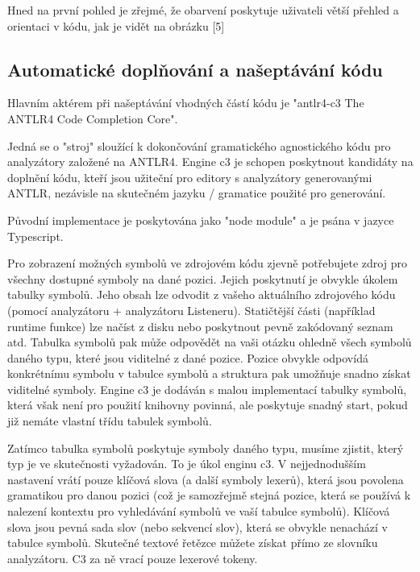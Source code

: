 \documentclass[czech,master,dept460,male,cpp,cpdeclaration]{diploma}
\begin{document}
Hned na první pohled je zřejmé, že obarvení poskytuje uživateli větší přehled a orientaci v kódu, jak je vidět na obrázku [5]


\subsection{Automatické doplňování a našeptávání kódu}

Hlavním aktérem při našeptávání vhodných částí kódu je "antlr4-c3 The ANTLR4 Code Completion Core".

Jedná se o "stroj" sloužící k dokončování gramatického agnostického kódu pro analyzátory založené na ANTLR4. Engine c3 je schopen poskytnout kandidáty na doplnění kódu, kteří jsou užiteční pro editory s analyzátory generovanými ANTLR, nezávisle na skutečném jazyku / gramatice použité pro generování.

Původní implementace je poskytována jako "node module" a je psána v jazyce Typescript.

Pro zobrazení možných symbolů ve zdrojovém kódu zjevně potřebujete zdroj pro všechny dostupné symboly na dané pozici. Jejich poskytnutí je obvykle úkolem tabulky symbolů. Jeho obsah lze odvodit z vašeho aktuálního zdrojového kódu (pomocí analyzátoru + analyzátoru Listeneru). Statičtější části (například runtime funkce) lze načíst z disku nebo poskytnout pevně zakódovaný seznam atd. Tabulka symbolů pak může odpovědět na vaši otázku ohledně všech symbolů daného typu, které jsou viditelné z dané pozice. Pozice obvykle odpovídá konkrétnímu symbolu v tabulce symbolů a struktura pak umožňuje snadno získat viditelné symboly. Engine c3 je dodáván s malou implementací tabulky symbolů, která však není pro použití knihovny povinná, ale poskytuje snadný start, pokud již nemáte vlastní třídu tabulek symbolů.

Zatímco tabulka symbolů poskytuje symboly daného typu, musíme zjistit, který typ je ve skutečnosti vyžadován. To je úkol enginu c3. V nejjednodušším nastavení vrátí pouze klíčová slova (a další symboly lexerů), která jsou povolena gramatikou pro danou pozici (což je samozřejmě stejná pozice, která se používá k nalezení kontextu pro vyhledávání symbolů ve vaší tabulce symbolů). Klíčová slova jsou pevná sada slov (nebo sekvencí slov), která se obvykle nenachází v tabulce symbolů. Skutečné textové řetězce můžete získat přímo ze slovníku analyzátoru. C3 za ně vrací pouze lexerové tokeny.
\end{document}
